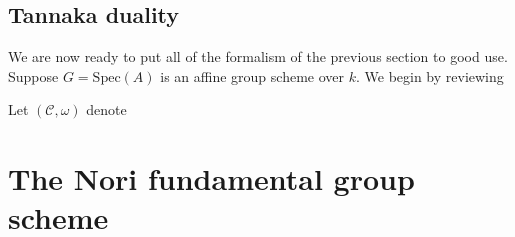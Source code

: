 \documentclass[10pt]{amsart}
\numberwithin{equation}{section}
\def\~#1{\mathscr{#1}}
\newcommand{\Spec}{\mathrm{Spec}}
\theoremstyle{plain}
\newtheorem{prop}[thm]{Proposition}
\theoremstyle{definition}
\theoremstyle{remark}
\begin{document}
\subsection{Tannaka duality} We are now ready to put all of the formalism of the previous section to good use. Suppose $G = \Spec(A)$ is an affine group scheme over $k$. We begin by reviewing 


Let $(\~C, \omega)$ denote

\section{The Nori fundamental group scheme} 
\end{document}
